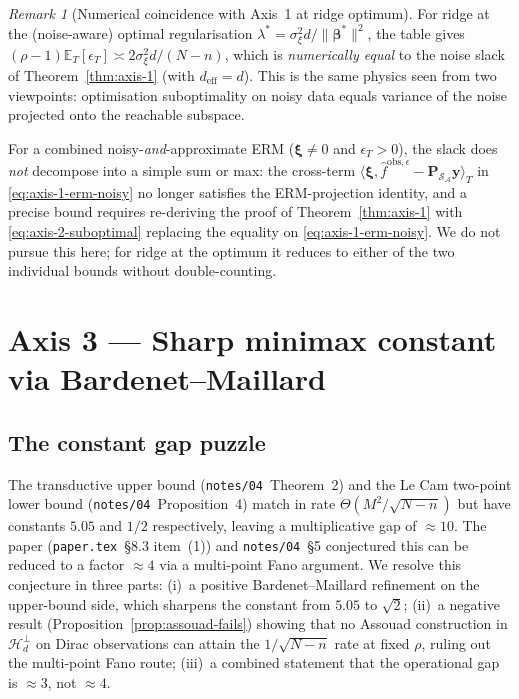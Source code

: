 \documentclass[11pt,a4paper]{article}
\theoremstyle{plain}
\theoremstyle{definition}
\theoremstyle{remark}
\newtheorem{remark}[theorem]{Remark}
\newcommand{\by}{\mathbf{y}}
\newcommand{\bxi}{\boldsymbol{\xi}}
\newcommand{\bbeta}{\boldsymbol{\beta}}
\newcommand{\bP}{\mathbf{P}}
\newcommand{\E}{\mathbb{E}}
\newcommand{\Scal}{\mathcal{S}}
\newcommand{\Acal}{\mathcal{A}}
\newcommand{\Hcal}{\mathcal{H}}
\begin{document}
\begin{remark}[Numerical coincidence with Axis~1 at ridge optimum]
\label{rem:axis-12-combined}
For ridge at the (noise-aware) optimal regularisation
$\lambda^* = \sigma_\xi^2 d / \|\bbeta^*\|^2$, the table gives
$(\rho - 1) \E_T[\epsilon_T] \asymp 2 \sigma_\xi^2 d/(N-n)$, which is
\emph{numerically equal} to the noise slack of
Theorem~\ref{thm:axis-1} (with $d_{\mathrm{eff}} = d$). This is the
same physics seen from two viewpoints: optimisation suboptimality on
noisy data equals variance of the noise projected onto the
reachable subspace.

For a combined noisy-\emph{and}-approximate ERM
($\bxi \ne 0$ and $\epsilon_T > 0$), the slack does \emph{not}
decompose into a simple sum or max: the cross-term
$\langle \bxi, \hat f^{\mathrm{obs},\epsilon} - \bP_{\Scal_\Acal}\by\rangle_T$
in \eqref{eq:axis-1-erm-noisy} no longer satisfies the ERM-projection
identity, and a precise bound requires re-deriving the proof of
Theorem~\ref{thm:axis-1} with \eqref{eq:axis-2-suboptimal} replacing
the equality on \eqref{eq:axis-1-erm-noisy}. We do not pursue this
here; for ridge at the optimum it reduces to either of the two
individual bounds without double-counting.
\end{remark}

\section{Axis 3 --- Sharp minimax constant via Bardenet--Maillard}
\label{sec:axis-3}

\subsection{The constant gap puzzle}

The transductive upper bound (\texttt{notes/04}~Theorem~2) and the
Le Cam two-point lower bound (\texttt{notes/04}~Proposition~4)
match in rate $\Theta(M^2/\sqrt{N-n})$ but have constants
$5.05$ and $1/2$ respectively, leaving a multiplicative gap of
$\approx 10$. The paper (\texttt{paper.tex}~\S8.3 item~(1)) and
\texttt{notes/04}~\S5 conjectured this can be reduced to a factor
$\approx 4$ via a multi-point Fano argument. We resolve this
conjecture in three parts: (i)~a positive Bardenet--Maillard
refinement on the upper-bound side, which sharpens the constant
from $5.05$ to $\sqrt 2$; (ii)~a negative result
(Proposition~\ref{prop:assouad-fails}) showing that no Assouad
construction in $\Hcal_d^\perp$ on Dirac observations can attain
the $1/\sqrt{N-n}$ rate at fixed $\rho$, ruling out the multi-point
Fano route; (iii)~a combined statement that the operational gap is
$\approx 3$, not $\approx 4$.
\end{document}
